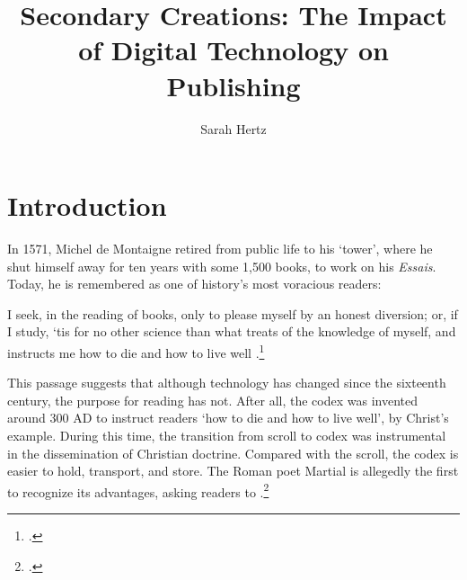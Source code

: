 \documentclass[12pt,a4paper]{scrartcl}
\author{Sarah Hertz}
\title{Secondary Creations: The Impact of Digital Technology on Publishing}
\subtitle{}
\date{}
\begin{document}
\begin{titlepage}
\maketitle
\thispagestyle{empty}
\end{titlepage}
\clearpage

\tableofcontents
\clearpage

\listoffigures
\clearpage

\clearpage
{}

{}
\section*{Introduction}

In 1571, Michel de Montaigne retired from public life to his ‘tower’, where he shut himself away for ten years with some 1,500 books, to work on his \textit{Essais}. Today, he is remembered as one of history's most voracious readers: 

\begin{displayquote}
I seek, in the reading of books, only to please myself by an honest diversion; or, if I study, ‘tis for no other science than what treats of the knowledge of myself, and instructs me how to die and how to live well \autocite{montaigne}.\footnote{\parencite[91]{french}.}
\end{displayquote}

This passage suggests that although technology has changed since the sixteenth century, the purpose for reading has not. After all, the codex was invented around 300 AD to instruct readers `how to die and how to live well', by Christ's example. During this time, the transition from scroll to codex was instrumental in the dissemination of Christian doctrine. Compared with the scroll, the codex is easier to hold, transport, and store. The Roman poet Martial is allegedly the first to recognize its advantages, asking readers to .\footnote{\parencite[187]{winsbury}.}
\end{document}
